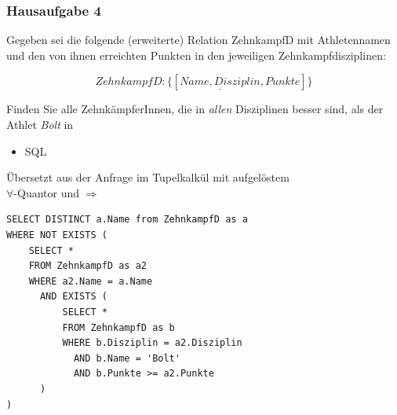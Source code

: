 \begin{frame}[fragile]
	\frametitle{Hausaufgabe 4}
	\vspace{0.25cm}

	\begin{multicols}{2}
		Gegeben sei die folgende (erweiterte) Relation ZehnkampfD mit 
		Athletennamen und den von ihnen erreichten Punkten in den jeweiligen Zehnkampfdisziplinen:

		\[ ZehnkampfD: \{[ \underline{Name, Disziplin}, Punkte ]\} \]

		Finden Sie alle ZehnkämpferInnen, die in \textit{allen} Disziplinen besser sind,
		als der Athlet \textit{Bolt} in
		\begin{itemize}
			\item SQL
		\end{itemize}
		\vfill\columnbreak
		Übersetzt aus der Anfrage im Tupelkalkül mit aufgelöstem \\
		\( \forall \)-Quantor und \( \Rightarrow \)
		\begin{verbatim}
SELECT DISTINCT a.Name from ZehnkampfD as a
WHERE NOT EXISTS (
	SELECT *
	FROM ZehnkampfD as a2
	WHERE a2.Name = a.Name
	  AND EXISTS (
		  SELECT *
		  FROM ZehnkampfD as b
		  WHERE b.Disziplin = a2.Disziplin
		    AND b.Name = 'Bolt'
		    AND b.Punkte >= a2.Punkte
	  )
)
		\end{verbatim}
	\end{multicols}
\end{frame}

